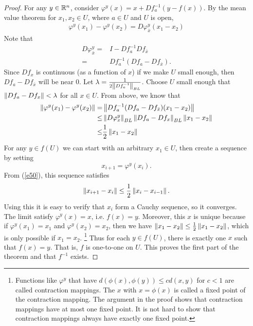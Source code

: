 \begin{proof} 
  For any $y
  \in \mathbb{R}^n$, consider $\varphi^y(x) = x + Df_a^{-1} \left(y - f(x)
  \right)$. 
  By the mean value theorem for $x_1, x_2 \in U$, where $a \in
  U$ and $U$ is open, 
  \begin{align*}
    \varphi^y(x_1) - \varphi^y(x_2) = D\varphi^y_{\bar{x}}  (x_1 -
    x_2)  
  \end{align*}
  Note that 
  \begin{align*}
    D \varphi^y_{\bar{x}} = & I - Df_a^{-1} Df_{\bar{x}} \\ 
    = & Df_a^{-1} (Df_a - Df_{\bar{x}}).
  \end{align*}
  Since $Df_x$ is continuous (as a function of $x$) if we make $U$
  small enough, then $Df_a - Df_{\bar{x}}$ will be near $0$. Let
  $\lambda = \frac{1}{2 \left\Vert {Df_a^{-1}} \right\Vert_{BL}}$. Choose $U$ small
  enough that $\left\Vert {Df_a - Df_{x}} \right\Vert < \lambda$ for all $x \in U$. From
  above, we know that
  \begin{align}
    \left\Vert {\varphi^y(x_1) - \varphi^y(x_2)} \right\Vert = & \left\Vert {Df_a^{-1} (Df_a -
      Df_{\bar{x}})(x_1-x_2) } \right\Vert \notag \\
    \leq & \left\Vert {D \varphi^y_x} \right\Vert_{BL} \left\Vert {Df_a -
      Df_x} \right\Vert_{BL} \left\Vert {x_1 - x_2} \right\Vert \notag \\
    \leq & \frac{1}{2}\left\Vert {x_1 - x_2} \right\Vert \label{e50}
  \end{align}
  For any $y \in f(U)$ we can start with an arbitrary $x_1 \in U$,
  then create a sequence by setting 
  \[ x_{i+1} = \varphi^y(x_i). \]
  From (\ref{e50}), this sequence satisfies 
  \[ \left\Vert {x_{i+1} - x_i} \right\Vert \leq \frac{1}{2} \left\Vert {x_i - x_{i-1} } \right\Vert. \]
  Using this it is easy to verify that $x_i$ form a Cauchy sequence,
  so it converges. The limit satisfy $\varphi^y(x) = x$, i.e. $f(x) =
  y$. Moreover, this $x$ is unique because if $\varphi^y(x_1) = x_1$
  and $\varphi^y(x_2) = x_2$, then we have $\left\Vert {x_1 - x_2} \right\Vert \leq
  \frac{1}{2}\left\Vert {x_1-x_2} \right\Vert$, which is only possible if $x_1 = x_2$.
  \footnote{Functions like $\varphi^y$ that have $d(\phi(x),\phi(y))
    \leq c d(x,y)$ for $c<1$ are called contraction mappings. The $x$
    with $x=\phi(x)$ is called a fixed point of the contraction
    mapping. The argument in the proof shows that contraction mappings
    have at most one fixed point. It is not hard to show that
    contraction mappings always have exactly one fixed point.}  Thus
  for each $y \in f(U)$, there is exactly one $x$ such that $f(x) =
  y$. That is, $f$ is one-to-one on $U$. This proves the first part of
  the theorem and that $f^{-1}$ exists.


\end{proof}
